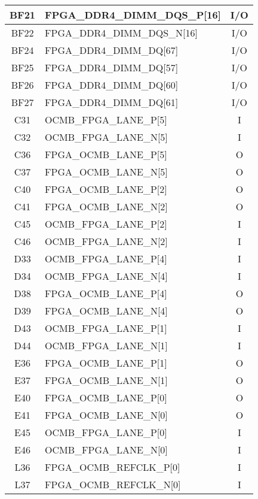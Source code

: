 \begin{longtable}[l]{| c | l | c |}
  BF21 & FPGA\_DDR4\_DIMM\_DQS\_P[16] & I/O \\ \hline
  BF22 & FPGA\_DDR4\_DIMM\_DQS\_N[16] & I/O \\ \hline
  BF24 & FPGA\_DDR4\_DIMM\_DQ[67]     & I/O \\ \hline
  BF25 & FPGA\_DDR4\_DIMM\_DQ[57]     & I/O \\ \hline
  BF26 & FPGA\_DDR4\_DIMM\_DQ[60]     & I/O \\ \hline
  BF27 & FPGA\_DDR4\_DIMM\_DQ[61]     & I/O \\ \hline
  C31  & OCMB\_FPGA\_LANE\_P[5]       & I   \\ \hline
  C32  & OCMB\_FPGA\_LANE\_N[5]       & I   \\ \hline
  C36  & FPGA\_OCMB\_LANE\_P[5]       & O   \\ \hline
  C37  & FPGA\_OCMB\_LANE\_N[5]       & O   \\ \hline
  C40  & FPGA\_OCMB\_LANE\_P[2]       & O   \\ \hline
  C41  & FPGA\_OCMB\_LANE\_N[2]       & O   \\ \hline
  C45  & OCMB\_FPGA\_LANE\_P[2]       & I   \\ \hline
  C46  & OCMB\_FPGA\_LANE\_N[2]       & I   \\ \hline
  D33  & OCMB\_FPGA\_LANE\_P[4]       & I   \\ \hline
  D34  & OCMB\_FPGA\_LANE\_N[4]       & I   \\ \hline
  D38  & FPGA\_OCMB\_LANE\_P[4]       & O   \\ \hline
  D39  & FPGA\_OCMB\_LANE\_N[4]       & O   \\ \hline
  D43  & OCMB\_FPGA\_LANE\_P[1]       & I   \\ \hline
  D44  & OCMB\_FPGA\_LANE\_N[1]       & I   \\ \hline
  E36  & FPGA\_OCMB\_LANE\_P[1]       & O   \\ \hline
  E37  & FPGA\_OCMB\_LANE\_N[1]       & O   \\ \hline
  E40  & FPGA\_OCMB\_LANE\_P[0]       & O   \\ \hline
  E41  & FPGA\_OCMB\_LANE\_N[0]       & O   \\ \hline
  E45  & OCMB\_FPGA\_LANE\_P[0]       & I   \\ \hline
  E46  & OCMB\_FPGA\_LANE\_N[0]       & I   \\ \hline
  L36  & FPGA\_OCMB\_REFCLK\_P[0]     & I   \\ \hline
  L37  & FPGA\_OCMB\_REFCLK\_N[0]     & I   \\ \hline

\end{longtable}
